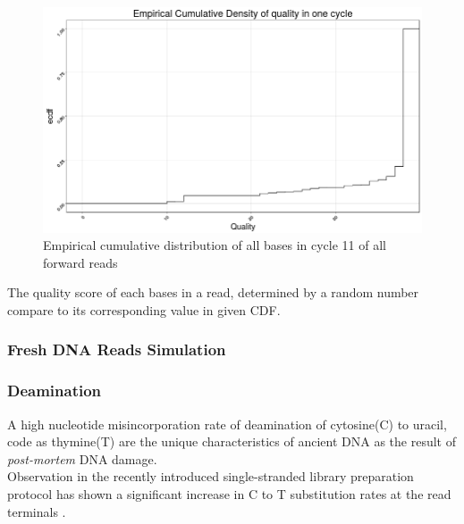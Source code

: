\documentclass[11pt,a4paper]{report}
\begin{document}
\begin{figure}[H]
\centering
\includegraphics[width=12cm]{pictures/Rplot_ecdf.png}
\caption{Empirical cumulative distribution of all bases in cycle 11 of all forward 
reads}
\label{CDF}
\end{figure}

The quality score of each bases in a read, determined by a random number compare to 
its corresponding value in given CDF.


\subsubsection{Fresh DNA Reads Simulation} \label{Fresh DNA Reads Simulation}












\subsubsection{Deamination} \label{Deamination}

A high nucleotide misincorporation rate of  deamination of cytosine(C) to uracil, 
code as thymine(T) are the unique characteristics of ancient DNA as the result 
of \emph{post-mortem} DNA damage\cite{mapdamage2}\cite{damagepattern}.\\ 

Observation in the recently introduced single-stranded library preparation protocol
has shown a significant increase in C to T substitution rates at the read terminals
\cite{mapdamage2}.\\
\end{document}
